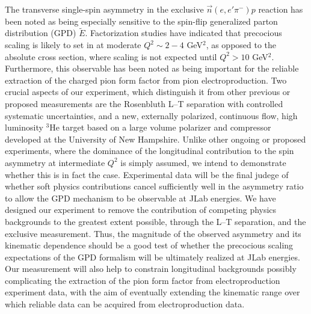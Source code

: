 \documentclass[preprint,superscriptaddress]{revtex4}
\begin{document}
The transverse single-spin asymmetry in the exclusive $\vec{n}(e,e'\pi^-)p$
reaction has been noted as being
especially sensitive to the spin-flip generalized parton distribution (GPD)
$\tilde{E}$.  Factorization studies have indicated that precocious scaling
is likely to set in at moderate $Q^2\sim 2-4$ GeV$^2$, as opposed to the
absolute cross section, where scaling is not expected until $Q^2>10$ GeV$^2$.
Furthermore, this observable has been noted as being important for the reliable
extraction of the charged pion form factor from pion electroproduction.  Two
crucial aspects of our experiment, which distinguish it from other previous or
proposed measurements are the Rosenbluth L--T separation with controlled
systematic uncertainties, and a new, externally polarized, continuous flow,
high luminosity $^3$He target based on a large volume polarizer and compressor
developed at the University of New Hampshire.  Unlike other ongoing or proposed
experiments, where the dominance of the longitudinal contribution to the spin
asymmetry at intermediate $Q^2$ is simply assumed, we intend to demonstrate
whether this is in fact the case.  Experimental data will be the final judege
of whether soft physics contributions cancel sufficiently well in the asymmetry
ratio to allow the GPD mechanism to be observable at JLab energies.  We have
designed our experiment to remove the contribution of competing physics
backgrounds to the greatest extent possible, through the L--T separation, and
the exclusive measurement.  Thus, the magnitude of the observed asymmetry and
its kinematic dependence should be a good test of whether the precocious
scaling expectations of the GPD formalism will be ultimately realized at JLab
energies.  Our measurement will also help to constrain longitudinal backgrounds
possibly complicating the extraction of the pion form factor from
electroproduction experiment data, with the aim of eventually extending the
kinematic range over which reliable data can be acquired from electroproduction
data.
\end{document}
